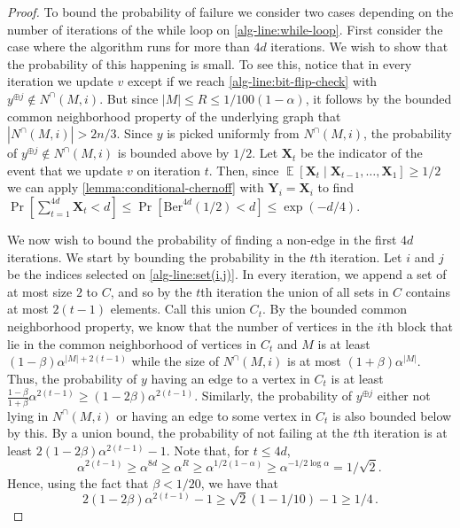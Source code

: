 \documentclass[10pt,a4paper]{article}
\theoremstyle{definition}
\theoremstyle{remark}
\theoremstyle{example}
\theoremstyle{plain}
\DeclareMathOperator{\Exp}{\mathbb{E}}
\newcommand{\CNbound}{R}
\newcommand{\edgeProbResLin}{\alpha}
\newcommand{\rbound}{1/100(1-\edgeProbResLin)}
\begin{document}
{}{
\begin{proof}
    To bound the probability of failure we consider two cases depending on the number of iterations of the while loop on \autoref{alg-line:while-loop}. First consider the case where the algorithm runs for more than $4d$ iterations. We wish to show that the probability of this happening is small. To see this,  notice that in every iteration we update $v$ except if we reach \autoref{alg-line:bit-flip-check} with $y^{\oplus j}\notin N^\cap(M,i)$. But since $|M|\leq \CNbound\leq \rbound$, it follows by the bounded common neighborhood property of the underlying graph  that $|N^\cap(M,i)| > 2n/3$. Since $y$ is picked uniformly from $N^\cap(M,i)$, the probability of $y^{\oplus j}\notin N^\cap(M,i)$ is bounded above by $1/2$. Let $\bm X_t$ be the indicator of the event that we update $v$ on iteration $t$. Then, since $\Exp [\bm X_t \mid \bm X_{t-1},\dots, \bm X_1] \geq 1/2$ we can apply \autoref{lemma:conditional-chernoff} with $\bm Y_i = \bm X_i$ to find $\Pr[\sum_{t=1}^{4d}\bm X_t<d] \leq \Pr[\mathrm{Ber}^{4d}(1/2)<d] \leq \exp(-d/4)$. 
    
    We now wish to bound the probability of finding a non-edge in the first $4d$ iterations. We start by bounding the probability in the $t$th iteration. Let $i$ and $j$ be the indices selected on \autoref{alg-line:set(i,j)}. In every iteration, we append a set of at most size $2$ to $C$, and so by the $t$th iteration the union of all sets in $C$ contains at most $2(t-1)$ elements. Call this union $C_t$. By the bounded common neighborhood property, we know that the number of vertices in the $i$th block that lie in the common neighborhood of vertices in $C_t$ and $M$ is at least $(1-\beta)\edgeProbResLin^{|M|+2(t-1)}$ while the size of $N^\cap(M,i)$ is at most $(1+\beta)\edgeProbResLin^{|M|}$. 
    Thus, the probability of $y$ having an edge to a vertex in $C_t$ is at least $\frac{1-\beta}{1+\beta}\edgeProbResLin^{2(t-1)}\geq(1-2\beta)\edgeProbResLin^{2(t-1)}$. Similarly, the probability of $y^{\oplus j}$ either not lying in $N^\cap(M,i)$ or having an edge to some vertex in $C_t$ is also bounded below by this. By a union bound, the probability of not failing at the $t$th iteration is at least $2(1-2\beta)\edgeProbResLin^{2(t-1)}-1$. Note that, for $t\leq4d$, 
    \begin{equation*}
    \edgeProbResLin^{2(t-1)}\geq \edgeProbResLin^{8d}\geq \edgeProbResLin ^R\geq \edgeProbResLin^{1/2(1-\edgeProbResLin)} \geq \edgeProbResLin^{-1/2\log \edgeProbResLin} = 1/\sqrt 2. \,
    \end{equation*} 
    Hence, using the fact that $\beta <1/20$, we have that
    \begin{equation*}
        2(1-2\beta)\edgeProbResLin^{2(t-1)}-1 \geq \sqrt2(1-1/10)-1\geq 1/4 \,.
    \end{equation*}
 

\end{proof}}
\end{document}
